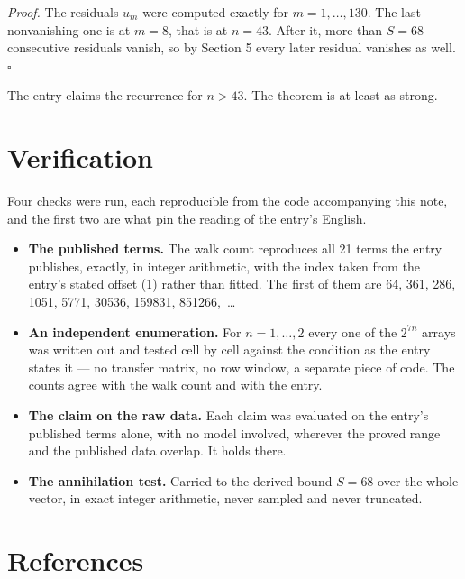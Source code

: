 \documentclass[11pt]{article}
\theoremstyle{definition}
\begin{document}
{\itshape Proof.} The residuals $u_m$ were computed exactly for $m = 1,\dots,130$. The last nonvanishing one is at $m = 8$, that is at $n = 43$. After it, more than $S = 68$ consecutive residuals vanish, so by Section 5 every later residual vanishes as well. $\square$

The entry claims the recurrence for $n > 43$. The theorem is at least as strong.

\section{Verification}

Four checks were run, each reproducible from the code accompanying this note, and the first two are what pin the reading of the entry's English.

\begin{itemize}

\item {\bfseries The published terms.} The walk count reproduces all 21 terms the entry publishes, exactly, in integer arithmetic, with the index taken from the entry's stated offset (1) rather than fitted. The first of them are 64, 361, 286, 1051, 5771, 30536, 159831, 851266,~\dots

\item {\bfseries An independent enumeration.} For $n = 1,\dots,2$ every one of the $2^{7n}$ arrays was written out and tested cell by cell against the condition as the entry states it --- no transfer matrix, no row window, a separate piece of code. The counts agree with the walk count and with the entry.

\item {\bfseries The claim on the raw data.} Each claim was evaluated on the entry's published terms alone, with no model involved, wherever the proved range and the published data overlap. It holds there.

\item {\bfseries The annihilation test.} Carried to the derived bound $S = 68$ over the whole vector, in exact integer arithmetic, never sampled and never truncated.

\end{itemize}

\section{References}
\end{document}
